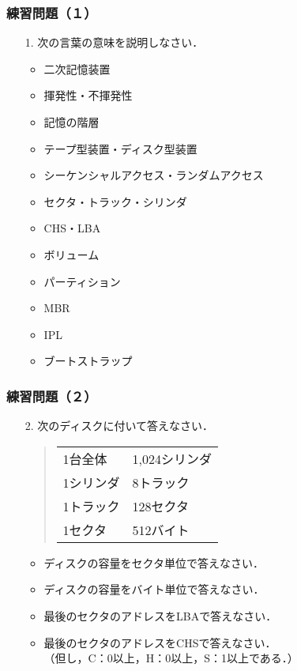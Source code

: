 \documentclass[unicode,handout]{beamer}                   %
\begin{document}
\begin{frame}
  \frametitle{練習問題（１）}
  \begin{enumerate}
  \item[1.] 次の言葉の意味を説明しなさい．
    \begin{itemize}
    \item 二次記憶装置
    \item 揮発性・不揮発性
    \item 記憶の階層
    \item テープ型装置・ディスク型装置
    \item シーケンシャルアクセス・ランダムアクセス
    \item セクタ・トラック・シリンダ
    \item CHS・LBA
    \item ボリューム
    \item パーティション
    \item MBR
    \item IPL
    \item ブートストラップ
    \end{itemize}
  \end{enumerate}
\end{frame}

\begin{frame}
  \frametitle{練習問題（２）}
  \begin{enumerate}
  \item[2.] 次のディスクに付いて答えなさい．
    \begin{quote}
      \begin{tabular}{l l}
        1台全体   & 1,024シリンダ  \\
        1シリンダ & 8トラック      \\
        1トラック & 128セクタ      \\
        1セクタ   & 512バイト
      \end{tabular}
    \end{quote}
    \begin{itemize}
    \item ディスクの容量をセクタ単位で答えなさい．
    \item ディスクの容量をバイト単位で答えなさい．
    \item 最後のセクタのアドレスをLBAで答えなさい．
    \item 最後のセクタのアドレスをCHSで答えなさい．\\
      （但し，C：0以上，H：0以上，S：1以上である．）
    \end{itemize}
  \end{enumerate}
\end{frame}
\end{document}
